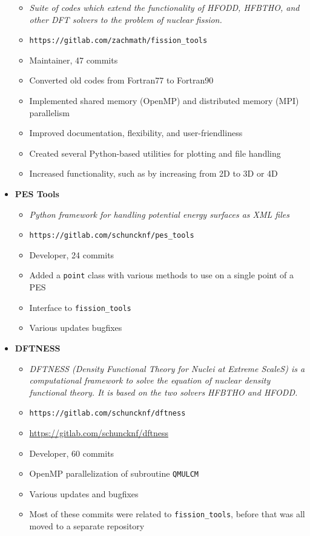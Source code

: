 \begin{itemize}
\begin{itemize}
		\item \textit{Suite of codes which extend the functionality of HFODD, HFBTHO, and other DFT solvers to the problem of nuclear fission.}
		\item \verb|https://gitlab.com/zachmath/fission_tools|
		\item Maintainer, 47 commits
		\item Converted old codes from Fortran77 to Fortran90
		\item Implemented shared memory (OpenMP) and distributed memory (MPI) parallelism
		\item Improved documentation, flexibility, and user-friendliness
		\item Created several Python-based utilities for plotting and file handling
		\item Increased functionality, such as by increasing from 2D to 3D or 4D
	\end{itemize}
	\item \textbf{PES Tools}
	\begin{itemize}
		\item \textit{Python framework for handling potential energy surfaces as XML files}
		\item \verb|https://gitlab.com/schuncknf/pes_tools|
		\item Developer, 24 commits
		\item Added a \verb|point| class with various methods to use on a single point of a PES
		\item Interface to \verb|fission_tools|
		\item Various updates bugfixes
	\end{itemize}
	\item \textbf{DFTNESS}
	\begin{itemize}
		\item \textit{DFTNESS (Density Functional Theory for Nuclei at Extreme ScaleS) is a computational framework to solve the equation of nuclear density functional theory. It is based on the two solvers HFBTHO and HFODD.}
		\item \verb|https://gitlab.com/schuncknf/dftness|
		\item \href{https://gitlab.com/schuncknf/dftness}{https://gitlab.com/schuncknf/dftness}
		\item Developer, 60 commits
		\item OpenMP parallelization of subroutine \verb|QMULCM|
		\item Various updates and bugfixes
		\item Most of these commits were related to \verb|fission_tools|, before that was all moved to a separate repository
	\end{itemize}
\end{itemize}